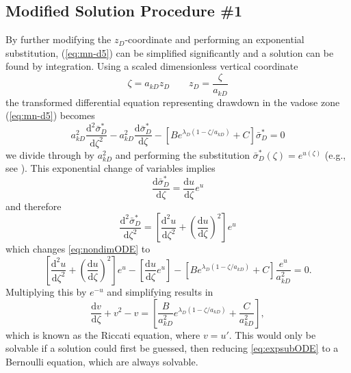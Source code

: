 \documentclass[12pt,letterpaper]{article}
\begin{document}
\subsection{Modified Solution Procedure \#1} 
By further modifying the $z_D$-coordinate and performing an exponential substitution, (\ref{eq:mn-d5}) can be simplified significantly and a solution can be found by integration.  Using a scaled dimensionless vertical coordinate 
\begin{equation}\nonumber
 \zeta= a_{kD} z_D \qquad z_D=\frac{\zeta}{a_{kD}} 
\end{equation}
the transformed differential equation representing drawdown in the vadose zone (\ref{eq:mn-d5}) becomes
\begin{equation}
  \label{eq:nondimODE}
  a_{kD}^2 \frac{\mathrm{d}^2
    \bar{\sigma}_D^{\ast}}{\mathrm{d}\zeta^2} - a_{kD}^2
  \frac{\mathrm{d} \bar{\sigma}_D^{\ast}}{\mathrm{d}\zeta} - \left[
    B e^{\lambda_D (1-\zeta/a_{kD})} + C\right] \bar{\sigma}_D^{\ast}=0
\end{equation}
we divide through by $a_{kD}^2$ and performing the substitution
$\bar{\sigma}_D^{\ast}(\zeta)=e^{u(\zeta)}$ (e.g., see \cite[p.\ 27]{bender1978advanced}).  This exponential change of variables implies
\begin{equation}\nonumber
\frac{\mathrm{d}\bar{\sigma}_D^{\ast}}{\mathrm{d}\zeta} =
\frac{\mathrm{d}u}{\mathrm{d}\zeta}e^u
\end{equation} 
and therefore
\begin{equation}\nonumber
\frac{\mathrm{d}^2\bar{\sigma}_D^{\ast}}{\mathrm{d}\zeta^2} =
\left[ \frac{\mathrm{d}^2u}{\mathrm{d}\zeta^2} +
\left(\frac{\mathrm{d}u}{\mathrm{d}\zeta}\right)^2 \right]e^u
\end{equation}
which changes \eqref{eq:nondimODE} to
\begin{equation}\nonumber
 \left[ \frac{\mathrm{d}^2u}{\mathrm{d}\zeta^2} +
  \left(\frac{\mathrm{d}u}{\mathrm{d}\zeta}\right)^2 \right]e^u -  \left[
  \frac{\mathrm{d}u}{\mathrm{d}\zeta}e^u \right]- \left[ B e^{\lambda_D (1-\zeta/a_{kD})} + C\right] \frac{e^{u}}{a_{kD}^2} =0.
\end{equation}
Multiplying this by $e^{-u}$ and simplifying results in
\begin{equation}
  \label{eq:expsubODE}
   \frac{\mathrm{d} v}{\mathrm{d}\zeta} + v^2 - v = \left[ \frac{B}{a_{kD}^2} e^{\lambda_D (1-\zeta/a_{kD})} + \frac{C}{a_{kD}^2}\right],
\end{equation}
which is known as the Riccati equation, where $v=u'$.  This would only be solvable if a solution could first be guessed, then reducing \eqref{eq:expsubODE} to a Bernoulli equation, which are always solvable.
\end{document}

